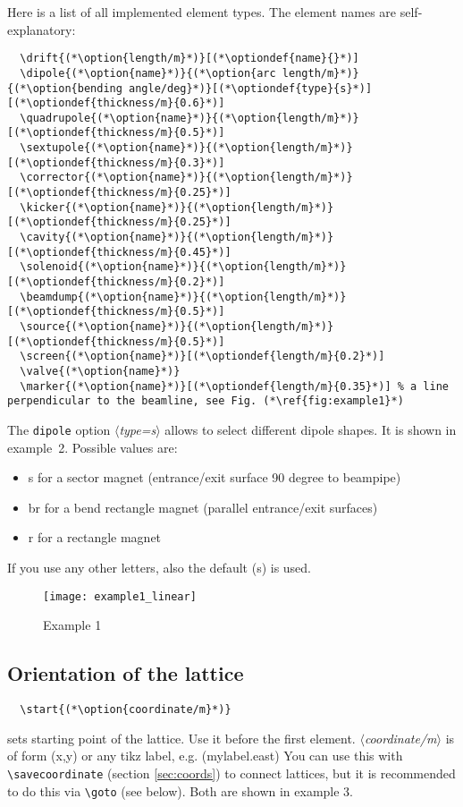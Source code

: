 \documentclass[a4paper]{scrartcl}
\newcommand{\option}[1]{{\color{blue}$\langle$\textit{#1}$\rangle$}}
\newcommand{\optiondef}[2]{{\color{green!50!black}$\langle$\textit{#1=#2}$\rangle$}}
\begin{document}
 Here is a list of all implemented element types. The element names are self-explanatory:
\begin{lstlisting}
  \drift{(*\option{length/m}*)}[(*\optiondef{name}{}*)]
  \dipole{(*\option{name}*)}{(*\option{arc length/m}*)}{(*\option{bending angle/deg}*)}[(*\optiondef{type}{s}*)][(*\optiondef{thickness/m}{0.6}*)]
  \quadrupole{(*\option{name}*)}{(*\option{length/m}*)}[(*\optiondef{thickness/m}{0.5}*)]
  \sextupole{(*\option{name}*)}{(*\option{length/m}*)}[(*\optiondef{thickness/m}{0.3}*)]
  \corrector{(*\option{name}*)}{(*\option{length/m}*)}[(*\optiondef{thickness/m}{0.25}*)]
  \kicker{(*\option{name}*)}{(*\option{length/m}*)}[(*\optiondef{thickness/m}{0.25}*)]
  \cavity{(*\option{name}*)}{(*\option{length/m}*)}[(*\optiondef{thickness/m}{0.45}*)]
  \solenoid{(*\option{name}*)}{(*\option{length/m}*)}[(*\optiondef{thickness/m}{0.2}*)]
  \beamdump{(*\option{name}*)}{(*\option{length/m}*)}[(*\optiondef{thickness/m}{0.5}*)]
  \source{(*\option{name}*)}{(*\option{length/m}*)}[(*\optiondef{thickness/m}{0.5}*)]
  \screen{(*\option{name}*)}[(*\optiondef{length/m}{0.2}*)]
  \valve{(*\option{name}*)}
  \marker{(*\option{name}*)}[(*\optiondef{length/m}{0.35}*)] % a line perpendicular to the beamline, see Fig. (*\ref{fig:example1}*)
\end{lstlisting}

The \lstinline+dipole+ option \optiondef{type}{s} allows to select different dipole
shapes. It is shown in example~2. Possible values are:
\begin{itemize}
\item s for a sector magnet (entrance/exit surface 90 degree to beampipe)
\item br for a bend rectangle magnet (parallel entrance/exit surfaces)
\item r for a rectangle magnet
\end{itemize}
If you use any other letters, also the default (s) is used.


\begin{figure}[ht]
  \centering
  \texttt{[image: example1\_linear]}
  \caption{Example 1}
  \label{fig:example1}
\end{figure}


\subsection{Orientation of the lattice}
\label{sec-5-2}

\begin{lstlisting}
  \start{(*\option{coordinate/m}*)}
\end{lstlisting}
sets starting point of the lattice. Use it before the first element. \option{coordinate/m}
is of form (x,y) or any tikz label, e.g. (mylabel.east) You can use this with
\lstinline+\savecoordinate+ (section \ref{sec:coords}) to connect lattices, but it is
recommended to do this via \lstinline+\goto+ (see below). Both are shown in example 3.
\end{document}
